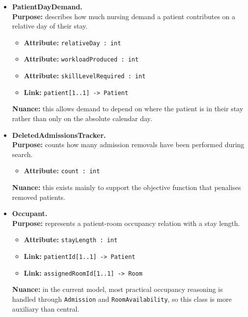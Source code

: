 \documentclass[10pt]{article}
\newcommand{\clabel}[1]{{\large\bfseries #1}}
\begin{document}
\begin{itemize}
    \item \clabel{PatientDayDemand.}\\
    \textbf{Purpose:} describes how much nursing demand a patient contributes on a relative day of their stay.
    \begin{itemize}
        \item \textbf{Attribute:} \texttt{relativeDay : int}
        \item \textbf{Attribute:} \texttt{workloadProduced : int}
        \item \textbf{Attribute:} \texttt{skillLevelRequired : int}
        \item \textbf{Link:} \texttt{patient[1..1] -> Patient}
    \end{itemize}
    \textbf{Nuance:} this allows demand to depend on where the patient is in their stay rather than only on the absolute calendar day.

    \item \clabel{DeletedAdmissionsTracker.}\\
    \textbf{Purpose:} counts how many admission removals have been performed during search.
    \begin{itemize}
        \item \textbf{Attribute:} \texttt{count : int}
    \end{itemize}
    \textbf{Nuance:} this exists mainly to support the objective function that penalises removed patients.

    \item \clabel{Occupant.}\\
    \textbf{Purpose:} represents a patient-room occupancy relation with a stay length.
    \begin{itemize}
        \item \textbf{Attribute:} \texttt{stayLength : int}
        \item \textbf{Link:} \texttt{patientId[1..1] -> Patient}
        \item \textbf{Link:} \texttt{assignedRoomId[1..1] -> Room}
    \end{itemize}
    \textbf{Nuance:} in the current model, most practical occupancy reasoning is handled through \texttt{Admission} and \texttt{RoomAvailability}, so this class is more auxiliary than central.
\end{itemize}
\end{document}
